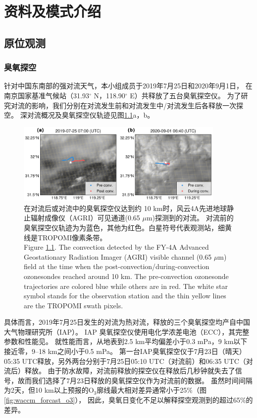 
\chapter{资料及模式介绍}

\section{原位观测}

\subsection{臭氧探空}

针对中国东南部的强对流天气，本小组成员于2019年7月25日和2020年9月1日，
在南京国家基准气候站（31.93$^{\circ}$ N，118.90$^{\circ}$ E）共释放了五台臭氧探空仪。
为了研究对流的影响，我们分别在对流发生前和对流发生中/对流发生后各释放一次探空。
深对流概况及臭氧探空仪轨迹见图\ref{fig:ozonesonde}a，b。

\begin{figure}[!htbp]
\centering
\includegraphics[width=0.9\textwidth]{./figures/ozonesonde.png}
\caption{在对流后或对流中的臭氧探空仪达到约 10 km时，风云4A先进地球静止辐射成像仪（AGRI）可见通道(0.65 $\mu$m)探测到的对流。
对流前的臭氧探空仪轨迹为为蓝色，其他为红色。白星符号代表观测站，细黄线是TROPOMI像素条带。\\
Figure \ref{fig:ozonesonde}. The convection detected by the FY-4A Advanced Geostationary Radiation Imager (AGRI)
visible channel (0.65 $\mu$m) field at the time when the post-convection/during-convection ozonesondes reached around 10 km.
The pre-convection ozonesonde trajectories are colored blue while others are in red.
The white star symbol stands for the observation station and the thin yellow lines are the TROPOMI swath pixels.
}
\label{fig:ozonesonde}
\end{figure}


具体而言，2019年7月25日发生的对流为热对流，释放的三个臭氧探空均产自中国大气物理研究所（IAP）。
IAP 臭氧探空仪使用电化学浓差电池（ECC），其完整参数和性能见\citet{Zhang.2014}。
就性能而言，从地表到2.5 km平均偏差小于0.3 mPa，9 km以下接近零，9--18 km之间小于0.5 mPa。
第一台IAP臭氧探空仪于7月23日（晴天）05:35 UTC释放，另外两台分别于7月25日05:10 UTC（对流前）和06:35 UTC（对流后）释放。
由于防水故障，对流前释放的探空仪在释放后几秒钟就失去了信号，故而我们选择了7月23日释放的臭氧探空仪作为对流前的数据。
虽然时间间隔为2天，但10 km以上预报的O$_3$廓线最大相对差异通常小于25\%（图\ref{fig:waccm_forcast_o3}），
因此，臭氧日变化不足以解释探空观测到的超过65\%的差异。

